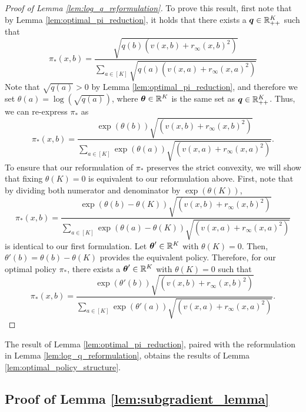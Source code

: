 \documentclass{article}
\begin{document}
\begin{appendices}
\begin{proof}[Proof of Lemma \ref{lem:log_q_reformulation}]
    To prove this result, first note that by Lemma \ref{lem:optimal_pi_reduction}, it holds that there exists a $\boldsymbol{q} \in \mathbb{R}_{++}^K$ such that 
    \begin{equation}
        \pi_*(x,b) = \frac{\sqrt{q(b) (v(x,b) + r_\infty(x,b)^2)}}{\sum_{a \in [K]} \sqrt{q(a) (v(x,a) + r_\infty(x,a)^2)}}
    \end{equation}
    Note that $\sqrt{q(a)} > 0$ by Lemma \ref{lem:optimal_pi_reduction}, and therefore we set $\theta(a) = \log(\sqrt{q(a)})$, where $\boldsymbol{\theta} \in \mathbb{R}^K$ is the same set as $\boldsymbol{q} \in \mathbb{R}^K_{++}$. Thus, we can re-express $\pi_*$ as 
    \begin{equation}
        \pi_*(x,b) = \frac{\exp(\theta(b))\sqrt{(v(x,b) + r_\infty(x,b)^2)}}{\sum_{a \in [K]}\exp(\theta(a))\sqrt{(v(x,a) + r_\infty(x,a)^2)}}.
    \end{equation}
    To ensure that our reformulation of $\pi_*$ preserves the strict convexity, we will show that fixing $\theta(K) = 0$ is equivalent to our reformulation above. First, note that by dividing both numerator and denominator by $\exp(\theta(K))$, 
    \begin{equation}
         \pi_{*}(x,b)=\frac{\exp(\theta(b) - \theta(K))\sqrt{(v(x,b) + r_\infty(x,b)^2)}}{\sum_{a \in [K]}\exp(\theta(a) - \theta(K))\sqrt{(v(x,a) + r_\infty(x,a)^2)}}
    \end{equation}
    is identical to our first formulation. Let $\boldsymbol\theta' \in \mathbb{R}^K$ with $\theta(K) = 0$. Then, $\theta'(b) = \theta(b) - \theta(K)$ provides the equivalent policy. Therefore, for our optimal policy $\pi_*$, there exists a $\boldsymbol{\theta}' \in \mathbb{R}^K$ with $\theta(K) = 0$ such that 
    \begin{equation}
        \pi_*(x,b) = \frac{\exp(\theta'(b))\sqrt{(v(x,b) + r_\infty(x,b)^2)}}{\sum_{a \in [K]}\exp(\theta'(a))\sqrt{(v(x,a) + r_\infty(x,a)^2)}}.
    \end{equation}
\end{proof}

The result of Lemma \ref{lem:optimal_pi_reduction}, paired with the reformulation in Lemma \ref{lem:log_q_reformulation}, obtains the results of Lemma \ref{lem:optimal_policy_structure}. 


\subsection{Proof of Lemma \ref{lem:subgradient_lemma}}


\end{appendices}
\end{document}
